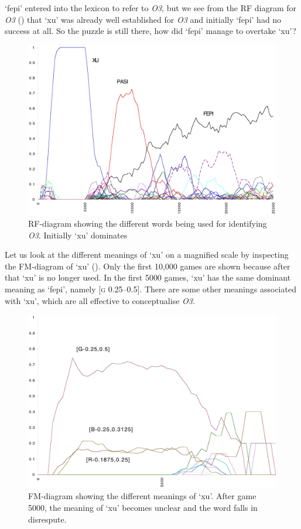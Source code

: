 `fepi' entered into the lexicon to refer to \emph{O3}, but we see
from the RF diagram for \emph{O3} () that 
`xu' was already well established for \emph{O3} and initially 
`fepi' had no success at all. 
So the puzzle is still there, how did `fepi' manage to 
overtake `xu'? 

\begin{figure}[htbp]
  \centerline{\includegraphics[width=.80\textwidth]{chap7/figs/RF-O3.pdf}}
\caption{\label{RF-O3a}RF-diagram showing the different
words being used for identifying \emph{O3}. Initially `xu' 
dominates }
\end{figure}
Let us look at the different meanings of `xu' on 
a magnified scale by 
inspecting the FM-diagram of `xu' (). 
Only the first 10,000 games are shown because after
that `xu' is no longer used. In the first 5000 games,  
`xu' has the same dominant meaning as `fepi', namely
[\textsc{g} 0.25–0.5]. There are some other meanings 
associated with `xu', which are all effective 
to conceptualise \emph{O3}.

\begin{figure}[htbp]
  \centerline{\includegraphics[width=.80\textwidth]{chap7/figs/FM-XU.pdf}}
\caption{\label{FM-XU.f}FM-diagram showing the different
meanings of `xu'. After game 5000, the meaning of `xu' becomes
unclear and the word falls in disrespute.}
\end{figure}

